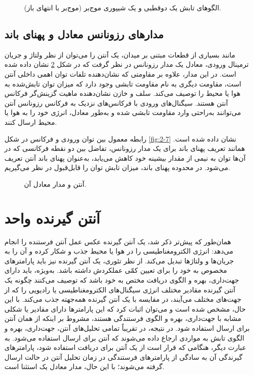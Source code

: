 \begin{figure}[ht]
	\centering
	\caption{الگوهای تابش یک دوقطبی و یک شیپوری موج‌بر (موج‌بر با انتهای باز).}
	\label{fig:2-5}
\end{figure}

\subsection{مدارهای رزونانس معادل و پهنای باند}
\label{subsec:2-1-3}

مانند بسیاری از قطعات مبتنی بر میدان، یک آنتن را می‌توان از نظر ولتاژ و جریان ترمینال ورودی، معادل یک مدار رزونانس در نظر گرفت که در شکل \ref{fig:2-6} نشان داده شده است. در این مدار، علاوه بر مقاومتی که نشان‌دهنده تلفات توان اهمی داخلی آنتن است، مقاومت دیگری به نام مقاومت تابشی وجود دارد که میزان توان تابش‌شده به هوا یا محیط را توصیف می‌کند. سلف و خازن نشان‌دهنده ماهیت گزینش‌گر فرکانس آنتن هستند. سیگنال‌های ورودی با فرکانس‌های نزدیک به فرکانس رزونانس آنتن می‌توانند به‌راحتی وارد مقاومت تابشی شده و به‌طور معادل، انرژی خود را به هوا یا محیط ارسال کنند.

رابطه معمول بین توان ورودی و فرکانس در شکل \ref{fig:2-7} نشان داده شده است. همانند تعریف پهنای باند برای یک مدار رزونانس، تفاضل بین دو نقطه فرکانسی که در آن‌ها توان به نیمی از مقدار بیشینه خود کاهش می‌یابد، به‌عنوان پهنای باند آنتن تعریف می‌شود. در محدوده پهنای باند، میزان تابش توان را قابل‌قبول در نظر می‌گیریم.

\begin{figure}[ht]
	\centering
	\caption{آنتن و مدار معادل آن.}
	\label{fig:2-6}
\end{figure}

\section{آنتن گیرنده واحد}
\label{sec:2-2}

همان‌طور که پیش‌تر ذکر شد، یک آنتن گیرنده عکس عمل آنتن فرستنده را انجام می‌دهد: انرژی الکترومغناطیسی را در هوا یا محیط جذب و شکار کرده و آن را به جریان‌ها و ولتاژها تبدیل می‌کند. از نظر تئوری، یک آنتن گیرنده نیز باید پارامترهای مخصوص به خود را برای تعیین کمّی عملکردش داشته باشد. به‌ویژه، باید دارای جهت‌داری، بهره و الگوی دریافت مختص به خود باشد که توصیف می‌کنند چگونه یک آنتن گیرنده مقادیر مختلف انرژی سیگنال‌های الکترومغناطیسی یا رادیویی را که از جهت‌های مختلف می‌آیند، در مقایسه با یک آنتن گیرنده همه‌جهته جذب می‌کند. با این حال، مشخص شده است و می‌توان اثبات کرد که این پارامترها دارای مقادیر یا شکلی مشابه با جهت‌داری، بهره و الگوی فرستندگی هستند، مشروط بر اینکه از همان آنتن برای ارسال استفاده شود. در نتیجه، در تقریباً تمامی تحلیل‌های آنتن، جهت‌داری، بهره و الگوی تابش به مواردی ارجاع داده می‌شوند که آنتن برای ارسال استفاده می‌شود. به عبارت دیگر، هنگامی که قرار است از یک آنتن برای دریافت استفاده شود، پارامترهای گیرندگی آن به سادگی از پارامترهای فرستندگی در زمان تحلیل آنتن در حالت ارسال گرفته می‌شوند؛ با این حال، مدار معادل یک استثنا است.

